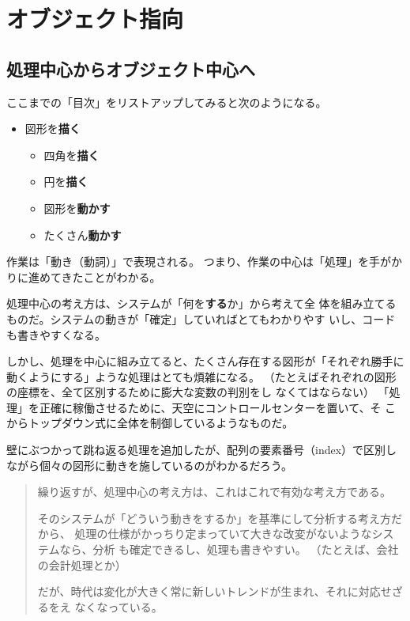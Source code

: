 \documentclass[uplatex,a4j,11pt]{jsarticle}
\begin{document}
\newpage

\section{オブジェクト指向}

\subsection{処理中心からオブジェクト中心へ}

ここまでの「目次」をリストアップしてみると次のようになる。

 \begin{itemize}
  \item 図形を{\bfseries 描く}
        \begin{itemize}
         \item 四角を{\bfseries 描く}
         \item 円を{\bfseries 描く}
         \item 図形を{\bfseries 動かす}
         \item たくさん{\bfseries 動かす}
        \end{itemize}
 \end{itemize}

作業は「動き（動詞）」で表現される。
つまり、作業の中心は「処理」を手がかりに進めてきたことがわかる。

処理中心の考え方は、システムが「何を{\bfseries する}か」から考えて全
体を組み立てるものだ。システムの動きが「確定」していればとてもわかりやす
いし、コードも書きやすくなる。

しかし、処理を中心に組み立てると、たくさん存在する図形が「それぞれ勝手に
動くようにする」ような処理はとても煩雑になる。
（たとえばそれぞれの図形の座標を、全て区別するために膨大な変数の判別をし
なくてはならない）
「処理」を正確に稼働させるために、天空にコントロールセンターを置いて、そ
こからトップダウン式に全体を制御しているようなものだ。

壁にぶつかって跳ね返る処理を追加したが、配列の要素番号（index）で区別し
ながら個々の図形に動きを施しているのがわかるだろう。


\begin{quotation}
 繰り返すが、処理中心の考え方は、これはこれで有効な考え方である。

 そのシステムが「どういう動きをするか」を基準にして分析する考え方だから、
 処理の仕様がかっちり定まっていて大きな改変がないようなシステムなら、分析
 も確定できるし、処理も書きやすい。
 （たとえば、会社の会計処理とか）

 だが、時代は変化が大きく常に新しいトレンドが生まれ、それに対応せざるをえ
 なくなっている。
\end{quotation}
\end{document}

